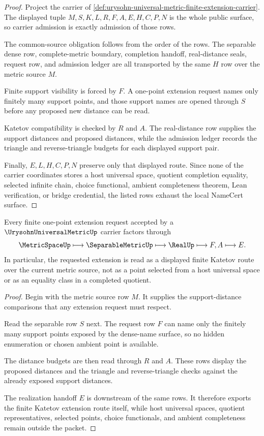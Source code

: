 \begin{proof}
Project the carrier of \autoref{def:urysohn-universal-metric-finite-extension-carrier}. The displayed tuple $M,S,K,L,R,F,A,E,H,C,P,N$ is the whole public surface, so carrier admission is exactly admission of those rows.

The common-source obligation follows from the order of the rows. The separable dense row, complete-metric boundary, completion handoff, real-distance seals, request row, and admission ledger are all transported by the same $H$ row over the metric source $M$.

Finite support visibility is forced by $F$. A one-point extension request names only finitely many support points, and those support names are opened through $S$ before any proposed new distance can be read.

Katetov compatibility is checked by $R$ and $A$. The real-distance row supplies the support distances and proposed distances, while the admission ledger records the triangle and reverse-triangle budgets for each displayed support pair.

Finally, $E,L,H,C,P,N$ preserve only that displayed route. Since none of the carrier coordinates stores a host universal space, quotient completion equality, selected infinite chain, choice functional, ambient completeness theorem, Lean verification, or bridge credential, the listed rows exhaust the local NameCert surface.
\end{proof}

\begin{theorem}\label{thm:urysohn-universal-metric-finite-extension-route}
Every finite one-point extension request accepted by a $\UrysohnUniversalMetricUp$ carrier factors through
$$
\MetricSpaceUp \longmapsto \SeparableMetricUp \longmapsto \RealUp \longmapsto F,A \longmapsto E .
$$
In particular, the requested extension is read as a displayed finite Katetov route over the current metric source, not as a point selected from a host universal space or as an equality class in a completed quotient.
\end{theorem}
\begin{proof}
Begin with the metric source row $M$. It supplies the support-distance comparisons that any extension request must respect.

Read the separable row $S$ next. The request row $F$ can name only the finitely many support points exposed by the dense-name surface, so no hidden enumeration or chosen ambient point is available.

The distance budgets are then read through $R$ and $A$. These rows display the proposed distances and the triangle and reverse-triangle checks against the already exposed support distances.

The realization handoff $E$ is downstream of the same rows. It therefore exports the finite Katetov extension route itself, while host universal spaces, quotient representatives, selected points, choice functionals, and ambient completeness remain outside the packet.
\end{proof}

